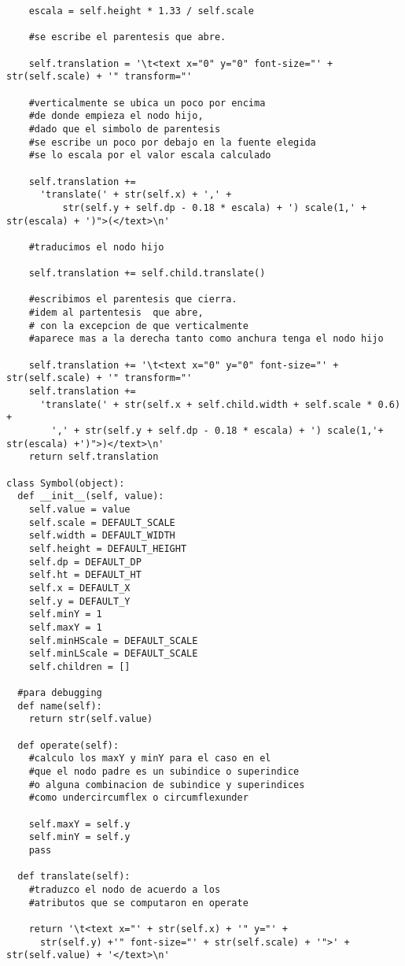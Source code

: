 \begin{verbatim}
    escala = self.height * 1.33 / self.scale
    
    #se escribe el parentesis que abre.
    
    self.translation = '\t<text x="0" y="0" font-size="' + str(self.scale) + '" transform="'
    
    #verticalmente se ubica un poco por encima 
    #de donde empieza el nodo hijo,
    #dado que el simbolo de parentesis 
    #se escribe un poco por debajo en la fuente elegida
    #se lo escala por el valor escala calculado

    self.translation += 
      'translate(' + str(self.x) + ',' + 
          str(self.y + self.dp - 0.18 * escala) + ') scale(1,' + str(escala) + ')">(</text>\n'
    
    #traducimos el nodo hijo

    self.translation += self.child.translate()

    #escribimos el parentesis que cierra.
    #idem al partentesis  que abre,
    # con la excepcion de que verticalmente 
    #aparece mas a la derecha tanto como anchura tenga el nodo hijo

    self.translation += '\t<text x="0" y="0" font-size="' + str(self.scale) + '" transform="'
    self.translation += 
      'translate(' + str(self.x + self.child.width + self.scale * 0.6) + 
        ',' + str(self.y + self.dp - 0.18 * escala) + ') scale(1,'+ str(escala) +')">)</text>\n'
    return self.translation

class Symbol(object):
  def __init__(self, value):
    self.value = value
    self.scale = DEFAULT_SCALE
    self.width = DEFAULT_WIDTH
    self.height = DEFAULT_HEIGHT
    self.dp = DEFAULT_DP
    self.ht = DEFAULT_HT
    self.x = DEFAULT_X
    self.y = DEFAULT_Y
    self.minY = 1
    self.maxY = 1
    self.minHScale = DEFAULT_SCALE
    self.minLScale = DEFAULT_SCALE
    self.children = []

  #para debugging
  def name(self):
    return str(self.value)

  def operate(self):
    #calculo los maxY y minY para el caso en el 
    #que el nodo padre es un subindice o superindice
    #o alguna combinacion de subindice y superindices 
    #como undercircumflex o circumflexunder
    
    self.maxY = self.y
    self.minY = self.y
    pass

  def translate(self):
    #traduzco el nodo de acuerdo a los 
    #atributos que se computaron en operate
    
    return '\t<text x="' + str(self.x) + '" y="' + 
      str(self.y) +'" font-size="' + str(self.scale) + '">' + str(self.value) + '</text>\n'

\end{verbatim}


